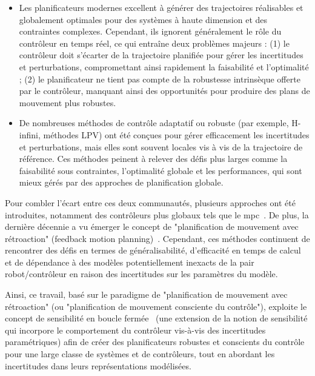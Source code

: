 \begin{itemize}
    \item Les planificateurs modernes excellent à générer des trajectoires réalisables et globalement optimales pour des systèmes à haute dimension et des contraintes complexes. 
    Cependant, ils ignorent généralement le rôle du contrôleur en temps réel, ce qui entraîne deux problèmes majeurs : (1) le contrôleur doit s’écarter de la trajectoire planifiée pour gérer les incertitudes et perturbations, compromettant ainsi rapidement la faisabilité et l’optimalité ; 
    (2) le planificateur ne tient pas compte de la robustesse intrinsèque offerte par le contrôleur, manquant ainsi des opportunités pour produire des plans de mouvement plus robustes.
    \item De nombreuses méthodes de contrôle adaptatif ou robuste (par exemple, H-infini, méthodes LPV) ont été conçues pour gérer efficacement les incertitudes et perturbations, mais elles sont souvent locales vis à vis de la trajectoire de référence. 
    Ces méthodes peinent à relever des défis plus larges comme la faisabilité sous contraintes, l’optimalité globale et les performances, qui sont mieux gérés par des approches de planification globale.
\end{itemize}
    
Pour combler l’écart entre ces deux communautés, plusieurs approches ont été introduites, notamment des contrôleurs plus globaux tels que le \gls{mpc}~\cite{cTMPC}. 
De plus, la dernière décennie a vu émerger le concept de "planification de mouvement avec rétroaction" (feedback motion planning)~\cite{cTognon, cContractThMP, cContractThOnlineMP, cMajundarLibrary, cFaSTrack, cRandUpRRT, cRandUP}. 
Cependant, ces méthodes continuent de rencontrer des défis en termes de généralisabilité, d'efficacité en temps de calcul et de dépendance à des modèles potentiellement inexacts de la pair robot/contrôleur en raison des incertitudes sur les paramètres du modèle.

Ainsi, ce travail, basé sur le paradigme de "planification de mouvement avec rétroaction" (ou "planification de mouvement consciente du contrôle"), exploite le concept de sensibilité en boucle fermée~\cite{cPi,cTh} (une extension de la notion de sensibilité qui incorpore le comportement du contrôleur vis-à-vis des incertitudes paramétriques) afin de créer des planificateurs robustes et conscients du contrôle pour une large classe de systèmes et de contrôleurs, tout en abordant les incertitudes dans leurs représentations modélisées.

